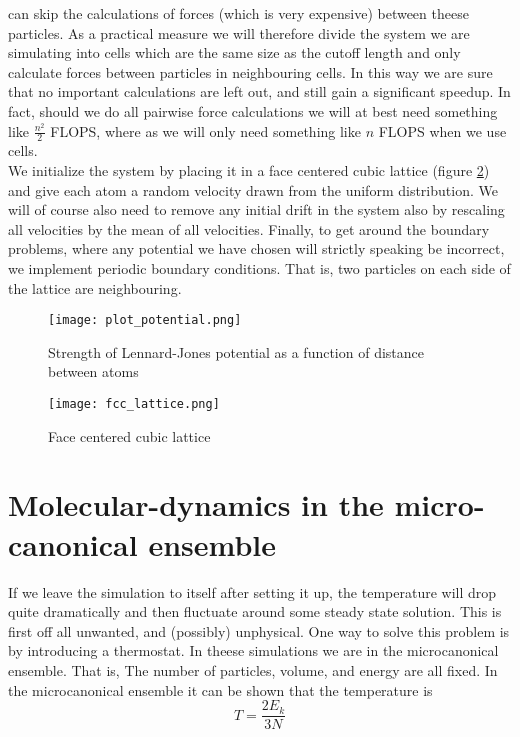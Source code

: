 \documentclass[a4paper,english, 10pt, twoside]{article}
\begin{document}
can skip the calculations of forces (which is very expensive) between theese particles. As a practical 
measure we will therefore divide the system we are simulating into cells which are the same size as the 
cutoff length and only calculate forces between particles in neighbouring cells. In this way we are sure 
that no important calculations are left out, and still gain a significant speedup. In fact, should we do 
all pairwise force calculations we will at best need something like $\frac{n^2}{2}$ FLOPS, where as we 
will only need something like $n$ FLOPS when we use cells.\\
We initialize the system by placing it in a face centered cubic lattice (figure \ref{fcc}) and give each 
atom a random velocity drawn from the uniform distribution. We will of course also need to remove any 
initial drift in the system also by rescaling all velocities by the mean of all velocities. Finally, to 
get around the boundary problems, where any potential we have chosen will strictly speaking be incorrect, 
we implement periodic boundary conditions. That is, two particles on each side of the lattice are neighbouring.

\begin{figure}[H]
\centering
\texttt{[image: plot\_potential.png]}
\caption{Strength of Lennard-Jones potential as a function of distance between atoms}
\label{LJ_cut}
\end{figure}
\begin{figure}[H]
\centering
\texttt{[image: fcc\_lattice.png]}
\caption{Face centered cubic lattice}
\label{fcc}
\end{figure}

\section{Molecular-dynamics in the micro-canonical ensemble}\label{section_2}
If we leave the simulation to itself after setting it up, the temperature will drop quite dramatically 
and then fluctuate around some steady state solution. This is first off all unwanted, and (possibly) 
unphysical. One way to solve this problem is by introducing a thermostat. In theese simulations we are 
in the microcanonical ensemble. That is, The number of particles, volume, and energy are all fixed. In 
the microcanonical ensemble it can be shown that the temperature is 
\begin{equation}\label{temperature}
T = \frac{2E_k}{3N}
\end{equation}
\end{document}
